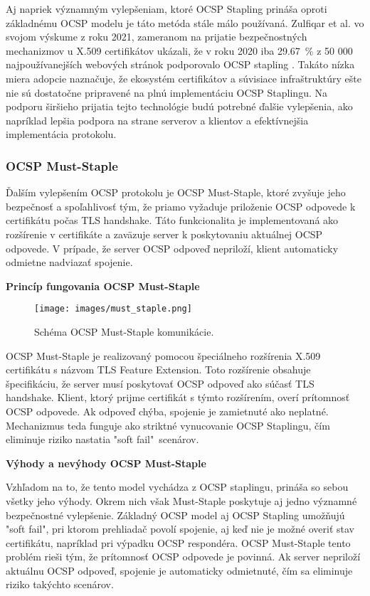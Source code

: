 \documentclass[12pt, twoside]{book}
\newcommand{\subsubsubsection}[1]{%
  \vspace{0.2em}  
  \textbf{#1} \\[0.2em]
  \hspace*{\parindent}
}
\begin{document}
Aj napriek významným vylepšeniam, ktoré OCSP Stapling prináša oproti základnému OCSP modelu je táto metóda stále málo používaná. Zulfiqar et al. vo svojom výskume z roku 2021, zameranom na prijatie bezpečnostných mechanizmov u X.509 certifikátov ukázali, že v roku 2020 iba 29.67~\% z 50 000 najpoužívanejších webových stránok podporovalo OCSP stapling \cite{stapling_adoption}. Takáto nízka miera adopcie naznačuje, že ekosystém certifikátov a súvisiace infraštruktúry ešte nie sú dostatočne pripravené na plnú implementáciu OCSP Staplingu. Na podporu širšieho prijatia tejto technológie budú potrebné ďalšie vylepšenia, ako napríklad lepšia podpora na strane serverov a klientov a efektívnejšia implementácia protokolu.


\subsubsection{OCSP Must-Staple}
Ďalším vylepšením OCSP protokolu je OCSP Must-Staple, ktoré zvyšuje jeho bezpečnosť a spoľahlivosť tým, že priamo vyžaduje priloženie OCSP odpovede k  certifikátu počas TLS handshake. Táto funkcionalita je implementovaná ako rozšírenie v certifikáte a zaväzuje server k poskytovaniu aktuálnej OCSP odpovede. V prípade, že server OCSP odpoveď nepriloží, klient automaticky odmietne nadviazať spojenie.


\subsubsubsection{Princíp fungovania OCSP Must-Staple}
\begin{figure}[H]
\centering
\texttt{[image: images/must\_staple.png]}
\caption{Schéma OCSP Must-Staple komunikácie.}
\end{figure}

OCSP Must-Staple je realizovaný pomocou špeciálneho rozšírenia X.509 certifikátu s názvom TLS Feature Extension. Toto rozšírenie obsahuje špecifikáciu, že server musí poskytovať OCSP odpoveď ako súčasť TLS handshake. Klient, ktorý prijme certifikát s týmto rozšírením, overí prítomnosť OCSP odpovede. Ak odpoveď chýba, spojenie je zamietnuté ako neplatné. Mechanizmus teda funguje ako striktné vynucovanie OCSP Staplingu, čím eliminuje riziko nastatia "soft fail"\ scenárov.

\subsubsubsection{Výhody a nevýhody OCSP Must-Staple}
Vzhľadom na to, že tento model vychádza z OCSP staplingu, prináša so sebou všetky jeho výhody. Okrem nich však Must-Staple poskytuje aj jedno významné bezpečnostné vylepšenie. Základný OCSP model aj OCSP Stapling umožňujú "soft fail", pri ktorom prehliadač povolí spojenie, aj keď nie je možné overiť stav certifikátu, napríklad pri výpadku OCSP respondéra. OCSP Must-Staple tento problém rieši tým, že prítomnosť OCSP odpovede je povinná. Ak server nepriloží aktuálnu OCSP odpoveď, spojenie je automaticky odmietnuté, čím sa eliminuje riziko takýchto scenárov.
\end{document}
